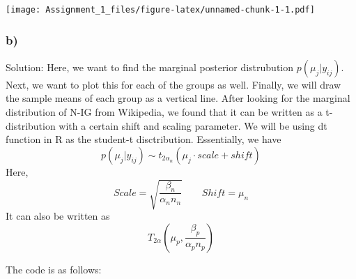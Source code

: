 \documentclass[]{article}
\begin{document}
\texttt{[image: Assignment\_1\_files/figure-latex/unnamed-chunk-1-1.pdf]}

\subsubsection{b)}\label{b-1}

Solution: Here, we want to find the marginal posterior distrubution
\(p(\mu_j | y_{ij})\). Next, we want to plot this for each of the groups
as well. Finally, we will draw the sample means of each group as a
vertical line. After looking for the marginal distribution of N-IG from
Wikipedia, we found that it can be written as a t-distribution with a
certain shift and scaling parameter. We will be using dt function in R
as the student-t disctribution. Essentially, we have
\[p(\mu_j | y_{ij}) \sim t_{2\alpha_{n}}(\mu_j \cdot scale + shift)\]
Here,
\[Scale = \sqrt{\frac{\beta_n}{\alpha_n n_n}} \qquad Shift = \mu_n\] It
can also be written as
\[T_{2\alpha} (\mu_p, \frac{\beta_p}{\alpha_p n_p})\]

The code is as follows:
\end{document}
